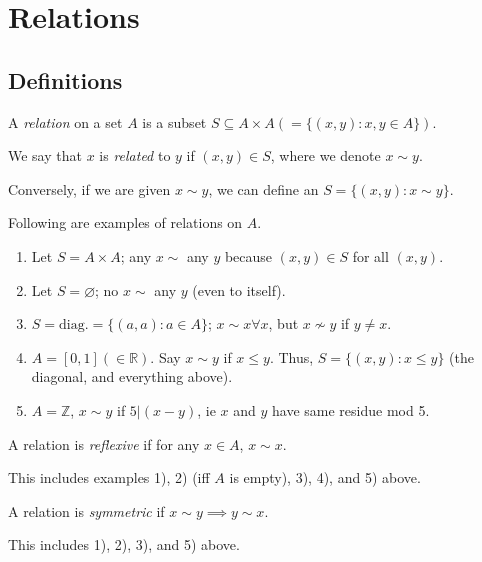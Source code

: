 \documentclass[12pt,oneside]{article}
\begin{document}
\section{Relations}
\subsection{Definitions}
\begin{definition}[Relation]
  A \emph{relation} on a set $A$ is a subset $S \subseteq A \times A (= \{(x,y) : x, y \in A\})$.

  We say that $x$ is \emph{related} to $y$ if $(x,y) \in S$, where we denote $x \sim y$. 

  Conversely, if we are given $x \sim y$, we can define an $S = \{(x,y): x \sim y\}$.
\end{definition}

\begin{example}
  Following are examples of relations on $A$.
  \begin{enumerate}[label=\arabic*)]
    \item Let $S = A \times A$; any $x \sim$ any $y$ because $(x,y) \in S$ for all $(x,y)$.
    \item Let $S = \varnothing$; no $x \sim$ any $y$ (even to itself).
    \item $S = \text{diag.} = \{(a,a) : a \in A\}$; $x \sim x \forall x$, but $x \nsim y$ if $y \neq x$.
    \item $A = [0,1] (\in \mathbb{R})$. Say $x \sim y$ if $x \leq y$. Thus, $S = \{(x,y) : x \leq y\}$ (the diagonal, and everything above).
    \item $A = \mathbb{Z}$, $x \sim y$ if $5 | (x-y)$, ie $x$ and $y$ have same residue mod 5.\footnotemark
  \end{enumerate}
\end{example}

\begin{definition}[Reflexive]
  A relation is \emph{reflexive} if for any $x \in A$, $x \sim x$. 
  
  This includes examples 1), 2) (iff $A$ is empty), 3), 4), and 5) above.
\end{definition}

\begin{definition}[Symmetric]
  A relation is \emph{symmetric} if $x \sim y \implies y \sim x$.

  This includes 1), 2), 3), and 5) above.
\end{definition}
\end{document}
